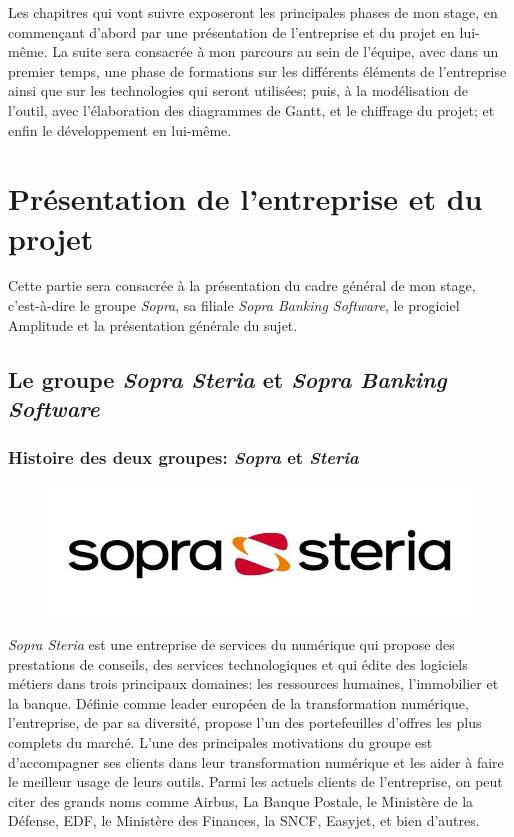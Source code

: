 \documentclass{polytech/polytech}
\begin{document}
Les chapitres qui vont suivre exposeront les principales phases de mon stage, en commençant d'abord par une présentation de l'entreprise et du projet en lui-même. La suite sera consacrée à mon parcours au sein de l'équipe, avec dans un premier temps, une phase de formations sur les différents éléments de l'entreprise ainsi que sur les technologies qui seront utilisées; puis, à la modélisation de l'outil, avec l'élaboration des diagrammes de Gantt, et le chiffrage du projet; et enfin le développement en lui-même. 


\part{Présentation de l'entreprise et du projet}


Cette partie sera consacrée à la présentation du cadre général de mon stage, c'est-à-dire le groupe \textit{Sopra}, sa filiale \textit{Sopra Banking Software}, le progiciel Amplitude et la présentation générale du sujet. 


\chapter{Le groupe \textit{Sopra Steria} et \textit{Sopra Banking Software}}

\section{Histoire des deux groupes: \textit{Sopra} et \textit{Steria}}

\begin{figure}
	\includegraphics[scale=1]{images/sopralogo}
\end{figure}

\textit{Sopra Steria} est une entreprise de services du numérique qui propose des prestations de conseils, des services technologiques et qui édite des logiciels métiers dans trois principaux domaines: les ressources humaines, l'immobilier et la banque. Définie comme leader européen de la transformation numérique, l'entreprise, de par sa diversité, propose l'un des portefeuilles d'offres les plus complets du marché. L'une des principales motivations du groupe est d'accompagner ses clients dans leur transformation numérique et les aider à faire le meilleur usage de leurs outils. Parmi les actuels clients de l'entreprise, on peut citer des grands noms comme Airbus, La Banque Postale, le Ministère de la Défense, EDF, le Ministère des Finances, la SNCF, Easyjet, et bien d'autres.  
\end{document}
